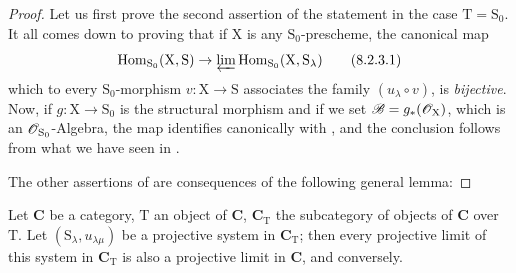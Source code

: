\begin{proof}
Let us first prove the second assertion of the statement in the case $\mathrm{T}=\mathrm{S}_0$.
It all comes down to proving that if $\mathrm{X}$ is any $\mathrm{S}_0$-prescheme, the canonical map
\begin{equation}
  \operatorname{Hom}_{\mathrm{S}_0}(\mathrm{X},\mathrm{S})\to\varprojlim\operatorname{Hom}_{\mathrm{S}_0}(\mathrm{X},\mathrm{S}_\lambda)
  \tag{8.2.3.1}
\label{IV.8.2.3.1}
\end{equation}
which to every $\mathrm{S}_0$-morphism $v:\mathrm{X}\to\mathrm{S}$ associates the family $(u_\lambda\circ v)$, is \emph{bijective}.
Now, if $g:\mathrm{X}\to\mathrm{S}_0$ is the structural morphism and if we set $\mathscr{B}=g_*(\mathscr{O}_\mathrm{X})$, which is an $\mathscr{O}_{\mathrm{S}_0}$-Algebra, the map  identifies canonically with  , and the conclusion follows from what we have seen in .

The other assertions of  are consequences of the following general lemma:
\end{proof}

\begin{lemma}[8.2.4]
\label{IV.8.2.4}
Let $\boldsymbol{C}$ be a category, $\mathrm{T}$ an object of $\boldsymbol{C}$, $\boldsymbol{C}_\mathrm{T}$ the subcategory of objects of $\boldsymbol{C}$ over $\mathrm{T}$.
Let $(\mathrm{S}_\lambda,u_{\lambda\mu})$ be a projective system in $\boldsymbol{C}_\mathrm{T}$; then every projective limit of this system in $\boldsymbol{C}_\mathrm{T}$ is also a projective limit in $\boldsymbol{C}$, and conversely.
\end{lemma}

